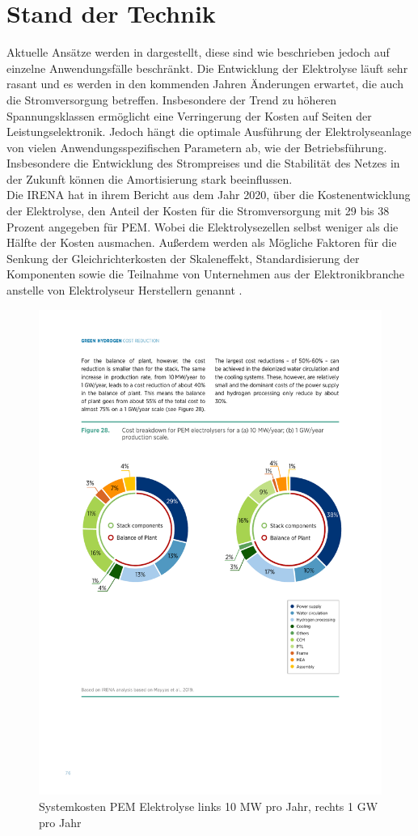 \section{Stand der Technik}
Aktuelle Ansätze werden in \cite{HydrogenRectifier} dargestellt, diese sind wie beschrieben jedoch auf einzelne Anwendungsfälle beschränkt. Die Entwicklung der Elektrolyse läuft sehr rasant und es werden in den kommenden Jahren Änderungen erwartet, die auch die Stromversorgung betreffen. Insbesondere der Trend zu höheren Spannungsklassen ermöglicht eine Verringerung der Kosten auf Seiten der Leistungselektronik. Jedoch hängt die optimale Ausführung der Elektrolyseanlage von vielen Anwendungsspezifischen Parametern ab, wie der Betriebsführung. Insbesondere die Entwicklung des Strompreises und die Stabilität des Netzes in der Zukunft können die Amortisierung stark beeinflussen.\\
Die \gls{IRENA} hat in ihrem Bericht aus dem Jahr 2020, über die Kostenentwicklung der Elektrolyse, den Anteil der Kosten für die Stromversorgung mit 29 bis 38 Prozent angegeben für \gls{PEM}. Wobei die Elektrolysezellen selbst weniger als die Hälfte der Kosten ausmachen. Außerdem werden als Mögliche Faktoren für die Senkung der Gleichrichterkosten der Skaleneffekt, Standardisierung der Komponenten sowie die Teilnahme von Unternehmen aus der Elektronikbranche anstelle von Elektrolyseur Herstellern genannt \cite{IRENA2020}.\\ 
\begin{figure}
	\centering
	\includegraphics[width=0.7\linewidth]{content/Grafiken/ElyCost}
	\caption[Systemkosten PEM Elektrolyse]{Systemkosten \gls{PEM} Elektrolyse links 10 MW pro Jahr, rechts 1 GW pro Jahr \cite{IRENA2020}}
	\label{fig:elycost}
\end{figure}

